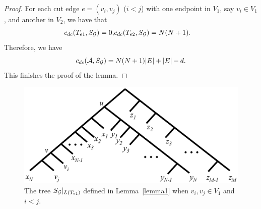 \documentclass[9.5pt,journal,letterpaper,compsoc]{IEEEtran}
\begin{document}
\begin{proof}
  For each cut edge $e=(v_i, v_j)$ ($i<j$) with one endpoint in $V_1$, say
$v_i\in V_1$, and another  in $V_2$, we
have that
    \begin{eqnarray}
       c_{dc}(T_{e1}, S_{\cal G})=0,&
       c_{dc}(T_{e2}, S_{\cal G})= N(N+1).
    \end{eqnarray}
Therefore, we have
  $$c_{dc}({\cal A}, S_{\cal G})= N(N+1)|E|+|E|-d.$$
This finishes the proof of the lemma.
\end{proof}

\begin{figure}[t!]
\begin{center}
\includegraphics[width=0.9\columnwidth]{Figure6}
\end{center}
\caption{The tree $S_{\cal G}|_{L(T_{e1})}$ defined in
Lemma~\ref{lemma1} when $v_i, v_j\in V_1$ and $i<j$.}
 \label{Fig6_lemma41}
\end{figure}
\end{document}
